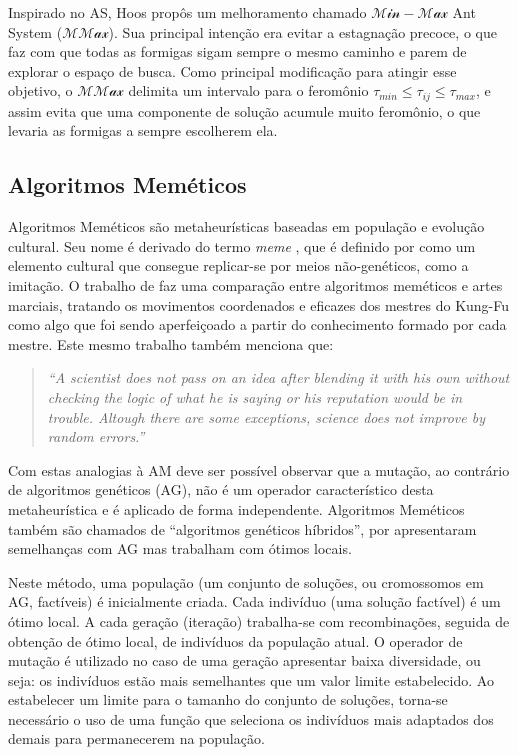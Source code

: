 Inspirado no AS, Hoos \cite{mmas-origin} propôs um melhoramento chamado
$\mathcal{Min-Max}$ Ant System ($\mathcal{MMax}$). Sua principal intenção
era evitar a estagnação precoce, o que faz com que todas as formigas sigam
sempre o mesmo caminho e parem de explorar o espaço de busca. Como principal
modificação para atingir esse objetivo, o $\mathcal{MMax}$ delimita um
intervalo para o feromônio $\tau_{min} \le \tau_{ij} \le \tau_{max}$,
e assim evita que uma componente de solução acumule muito feromônio, %
o que levaria as formigas a sempre escolherem ela.

\subsection{Algoritmos Meméticos}

Algoritmos Meméticos \cite{moscato1} são metaheurísticas baseadas
em população e evolução cultural.
Seu nome é derivado do termo \textit{meme} \cite{dawkins}, que é
definido por \cite{oxford-dict} como um elemento cultural que consegue
replicar-se por meios não-genéticos, como a imitação.
O trabalho de \cite{moscato1} faz uma comparação entre algoritmos
meméticos e artes marciais, tratando os movimentos coordenados e
eficazes dos mestres do Kung-Fu como algo que foi sendo aperfeiçoado
a partir do conhecimento formado por cada mestre. Este mesmo trabalho
também menciona que:
\begin{quote}
\textit{``A scientist does not pass on an idea after blending it with
  his own without checking the logic of what he is saying or his
  reputation would be in trouble. Altough there are some
  exceptions, science does not improve by random errors.''}
\end{quote}
Com estas analogias à AM deve ser possível observar que a mutação, ao
contrário de algoritmos genéticos (AG), não é um operador
característico desta metaheurística e é aplicado de forma
independente. Algoritmos Meméticos também são chamados de ``algoritmos
genéticos híbridos'', por apresentaram semelhanças com AG mas
trabalham com ótimos locais.

Neste método, uma população (um conjunto de soluções, ou cromossomos
em AG, factíveis) é
inicialmente criada. Cada indivíduo (uma solução factível) é um ótimo
local. A cada geração (iteração) trabalha-se com recombinações,
seguida de obtenção de ótimo local, de indivíduos da população
atual. O operador de mutação é utilizado no caso de uma
geração apresentar baixa diversidade, ou seja: os indivíduos estão
mais semelhantes que um valor limite estabelecido.
Ao estabelecer um limite para o tamanho do conjunto de soluções,
torna-se necessário o uso de uma função que seleciona os indivíduos
mais adaptados dos demais para permanecerem na população.

